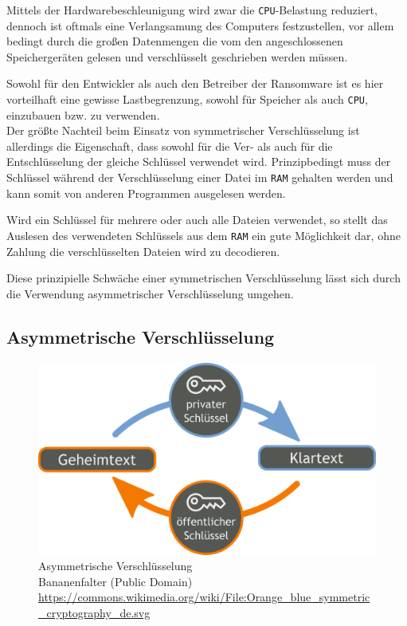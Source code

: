 Mittels der Hardwarebeschleunigung wird zwar die \texttt{CPU}-Belastung reduziert, dennoch ist oftmals eine Verlangsamung des Computers festzustellen, vor allem bedingt durch die großen Datenmengen die vom den angeschlossenen Speichergeräten gelesen und verschlüsselt geschrieben werden müssen.

Sowohl für den Entwickler als auch den Betreiber der Ransomware ist es hier vorteilhaft eine gewisse Lastbegrenzung, sowohl für Speicher als auch \texttt{CPU}, einzubauen bzw. zu verwenden.
\\

Der größte Nachteil beim Einsatz von symmetrischer Verschlüsselung ist allerdings die Eigenschaft, dass sowohl für die Ver- als auch für die Entschlüsselung der gleiche Schlüssel verwendet wird. Prinzipbedingt muss der Schlüssel während der Verschlüsselung einer Datei im \texttt{RAM} gehalten werden und kann somit von anderen Programmen ausgelesen werden.

Wird ein Schlüssel für mehrere oder auch alle Dateien verwendet, so stellt das Auslesen des verwendeten Schlüssels aus dem \texttt{RAM} ein gute Möglichkeit dar, ohne Zahlung die verschlüsselten Dateien wird zu decodieren. 

Diese prinzipielle Schwäche einer symmetrischen Verschlüsselung lässt sich durch die Verwendung asymmetrischer Verschlüsselung umgehen.

\subsection{Asymmetrische Verschlüsselung}
\label{sec:asym_verschl}

\begin{figure}[h!]
	\centering
	\includegraphics[scale=0.25]{img/AsymKrypto.png}
	\caption{Asymmetrische Verschlüsselung \\
	Bananenfalter (Public Domain) \\ \url{https://commons.wikimedia.org/wiki/File:Orange_blue_symmetric_cryptography_de.svg}}
	\label{fig:asym_verschl}
\end{figure}

